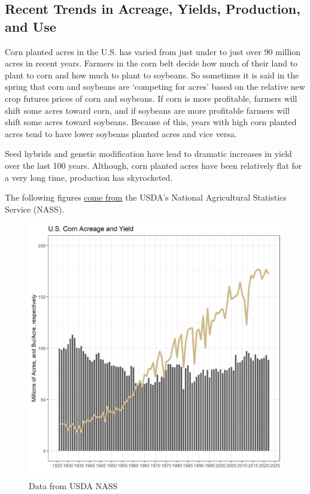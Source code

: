 \documentclass[
  letterpaper,
  DIV=11,
  numbers=noendperiod]{scrreprt}
\begin{document}
\subsection{Recent Trends in Acreage, Yields, Production, and
Use}\label{recent-trends-in-acreage-yields-production-and-use}

Corn planted acres in the U.S. has varied from just under to just over
90 million acres in recent years. Farmers in the corn belt decide how
much of their land to plant to corn and how much to plant to soybeans.
So sometimes it is said in the spring that corn and soybeans are
`competing for acres' based on the relative new crop futures prices of
corn and soybeans. If corn is more profitable, farmers will shift some
acres toward corn, and if soybeans are more profitable farmers will
shift some acres toward soybeans. Because of this, years with high corn
planted acres tend to have lower soybeans planted acres and vice versa.

Seed hybrids and genetic modification have lead to dramatic increases in
yield over the last 100 years. Although, corn planted acres have been
relatively flat for a very long time, production has skyrocketed.

The following figures
\href{http://www.ers.usda.gov/topics/crops/corn/background.aspx}{come
from} the USDA's National Agricultural Statistics Service (NASS).

\begin{figure}[H]

{\centering \includegraphics{assets/PrimerforGrain_CornAcandY.png}

}

\caption{Data from USDA NASS}

\end{figure}%
\end{document}
